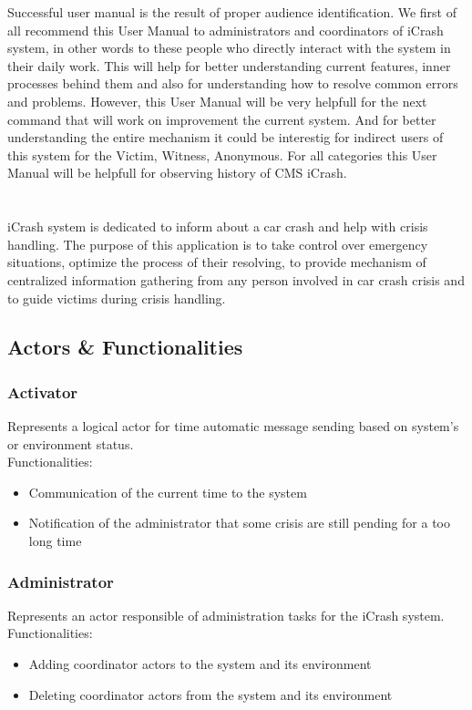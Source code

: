 Successful user manual is the result of proper audience identification. We first
of all recommend this User Manual to administrators and coordinators of iCrash
system, in other words to these people who directly interact with the
system in their daily work. This will help for better understanding current
features, inner processes behind them and also for understanding how to resolve common errors
and problems. However, this User Manual will be very helpfull for the next command that will
work on improvement the current system. And for better understanding the entire mechanism it could be interestig for indirect users of this system for the Victim, Witness, Anonymous.
For all categories this User Manual will be helpfull for observing history of
CMS iCrash. 


\section{\mysystemname}
iCrash system is dedicated to inform about a car crash and help with crisis
handling. The purpose of this application is to take control over emergency
situations, optimize the process of their resolving, to provide mechanism of
centralized information gathering from any person involved in car crash crisis
and to guide victims during crisis handling.

\subsection{Actors \& Functionalities}

\subsubsection{Activator}
Represents a logical actor for time automatic message sending based on system’s
or environment status.\\
Functionalities:
\begin{itemize}
  \item Communication of the current time to the system
  \item Notification of the administrator that some crisis are still pending for
  a too long time
\end{itemize}

\subsubsection{Administrator}
Represents an actor responsible of administration tasks for the iCrash system.\\
Functionalities:
\begin{itemize}
  \item Adding coordinator actors to the system and its environment
  \item Deleting coordinator actors from the system and its environment
\end{itemize}

